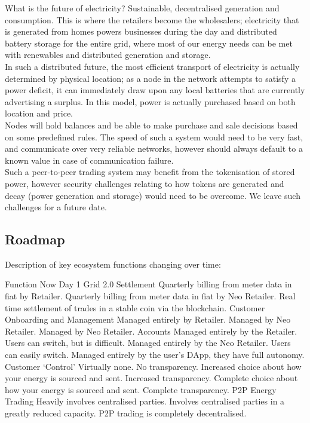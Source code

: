 \documentclass{article}
\theoremstyle{definition}
\theoremstyle{plain} %
\begin{document}
What is the future of electricity? Sustainable, decentralised generation and consumption. This is where the retailers become the wholesalers; electricity that is generated from homes powers businesses during the day and distributed battery storage for the entire grid, where most of our energy needs can be met with renewables and distributed generation and storage. \\

\noindent In such a distributed future, the most efficient transport of electricity is actually determined by physical location; as a node in the network attempts to satisfy a power deficit, it can immediately draw upon any local batteries that are currently advertising a surplus. In this model, power is actually purchased based on both location and price.\\

\noindent Nodes will hold balances and be able to make purchase and sale decisions based on some predefined rules. The speed of such a system would need to be very fast, and communicate over very reliable networks, however should always default to a known value in case of communication failure.\\

\noindent Such a peer-to-peer trading system may benefit from the tokenisation of stored power, however security challenges relating to how tokens are generated and decay (power generation and storage) would need to be overcome. We leave such challenges for a future date.\\


\pagebreak
\subsection{Roadmap}

Description of key ecosystem functions changing over time:

Function
Now
Day 1 
Grid 2.0
Settlement
Quarterly billing from meter data in fiat by Retailer.
Quarterly billing from meter data in fiat by Neo Retailer.
Real time settlement of trades in a stable coin via the blockchain.
Customer Onboarding and Management
Managed entirely by Retailer.
Managed by Neo Retailer.
Managed by Neo Retailer.
Accounts
Managed entirely by the Retailer. Users can switch, but is difficult.
Managed entirely by the Neo Retailer. Users can easily switch.
Managed entirely by the user’s DApp, they have full autonomy.
Customer ‘Control’
Virtually none. No transparency.
Increased choice about how your energy is sourced and sent. Increased transparency.
Complete choice about how your energy is sourced and sent. Complete transparency.
P2P Energy Trading
Heavily involves centralised parties.
Involves centralised parties in a greatly reduced capacity.
P2P trading is completely decentralised.
\end{document}
